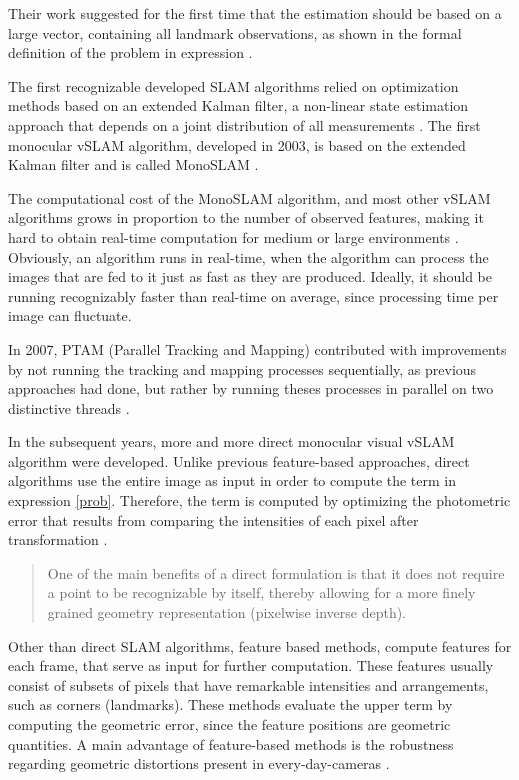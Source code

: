 Their work suggested for the first time that the estimation should be based on a large vector, containing all landmark observations, as shown in the formal definition of the problem in 
expression \label{prob}.

The first recognizable developed SLAM algorithms relied on optimization methods based on an extended Kalman filter, a non-linear state estimation approach
 that depends on a joint distribution of all measurements \cite{evolved}. The first monocular vSLAM algorithm, developed in 2003, 
 is based on the extended Kalman filter and is called MonoSLAM \cite{mono}. 
 
 The computational cost of the MonoSLAM algorithm, and most other vSLAM algorithms grows in proportion to the number of observed features, making it hard to obtain real-time 
 computation for medium or large environments \cite{evolved}. Obviously, an algorithm runs in real-time, when 
 the algorithm can process the images that are fed to it just as fast as they are produced. Ideally, it should 
 be running recognizably faster than real-time on average, since processing time per image can fluctuate. 

 In 2007, PTAM (Parallel Tracking and Mapping) contributed with improvements by not running the tracking and mapping processes sequentially, as previous approaches had done, but rather by running theses processes in parallel on two distinctive threads \cite{ptam}. 
 
 In the subsequent years, more and more direct monocular visual vSLAM algorithm were developed. Unlike previous feature-based approaches, direct algorithms use the entire image as input in order to compute the term in expression \ref{prob}. 
 Therefore, the term is computed by optimizing the photometric error that results from comparing the intensities 
 of each pixel after transformation \cite{dso}.

  \begin{quote}
	One of the main benefits of a direct formulation is that it
	does not require a point to be recognizable by itself, thereby
	allowing for a more finely grained geometry representation (pixelwise inverse depth). \cite{dso}
  \end{quote}

Other than direct SLAM algorithms, feature based methods, compute features for each frame, that serve as input for further computation. These features usually consist of subsets of pixels that have remarkable 
intensities and arrangements, such as corners (landmarks). These methods evaluate the upper term by computing the geometric error, since the feature positions are geometric 
quantities. A main advantage of feature-based methods is the robustness regarding geometric distortions present in every-day-cameras \cite{dso}. 

